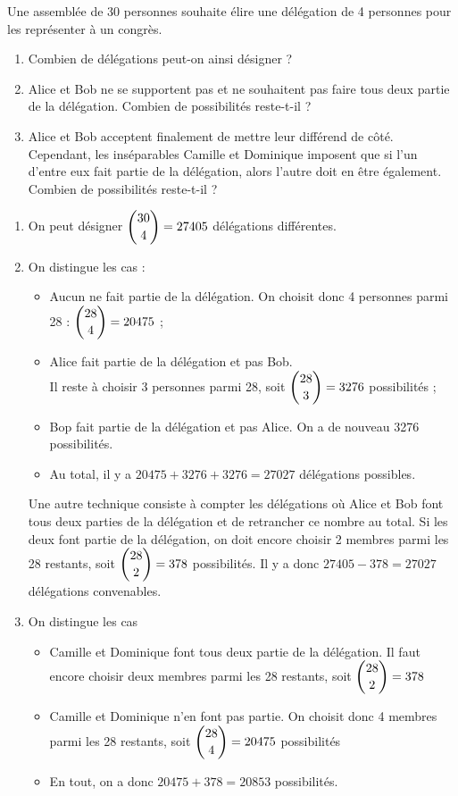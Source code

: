 \documentclass[11pt,fleqn, openany]{book} %
\begin{document}
\begin{exercise}
Une assemblée de 30 personnes souhaite élire une délégation de 4 personnes pour les représenter à un congrès.
\begin{enumerate}
\item Combien de délégations peut-on ainsi désigner ?
\item Alice et Bob ne se supportent pas et ne souhaitent pas faire tous deux partie de la délégation. Combien de possibilités reste-t-il ?
\item Alice et Bob acceptent finalement de mettre leur différend de côté. Cependant, les inséparables Camille et Dominique imposent que si l'un d'entre eux fait partie de la délégation, alors l'autre doit en être également. Combien de possibilités reste-t-il ?
\end{enumerate}
\newpage \end{exercise}

\begin{solution}\hspace{0pt}
\vspace{-0.5cm}
\begin{enumerate}
\item On peut désigner $\dbinom{30}{4}=27405$ délégations différentes.

\item On distingue les cas :
\begin{itemize}
\item Aucun ne fait partie de la délégation. On choisit donc 4 personnes parmi 28 : $\dbinom{28}{4}=20475$ ;
\item Alice fait partie de la délégation et pas Bob. \\ Il reste à choisir 3 personnes parmi 28, soit $\dbinom{28}{3}=3276$ possibilités ;
\item Bop fait partie de la délégation et pas Alice. On a de nouveau 3276 possibilités.
\item Au total, il y a $20475+3276+3276=27027$ délégations possibles.
\end{itemize}
Une autre technique consiste à compter les délégations où Alice et Bob font tous deux parties de la délégation et de retrancher ce nombre au total. Si les deux font partie de la délégation, on doit encore choisir 2 membres parmi les 28 restants, soit $\dbinom{28}{2}=378$ possibilités. Il y a donc $27405-378=27027$ délégations convenables.

\item On distingue les cas
\begin{itemize}
\item Camille et Dominique font tous deux partie de la délégation. Il faut encore choisir deux membres parmi les 28 restants, soit $\dbinom{28}{2}=378$
\item Camille et Dominique n'en font pas partie. On choisit donc 4 membres parmi les 28 restants, soit $\dbinom{28}{4}=20475$ possibilités
\item En tout, on a donc $20475+378=20853$ possibilités.
\end{itemize}

\end{enumerate}
\newpage
\end{solution}
\end{document}
